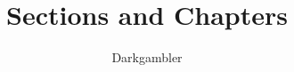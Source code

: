 


\title{Sections and Chapters}
\author{Darkgambler}
\date{ }


\maketitle
  
\tableofcontents







